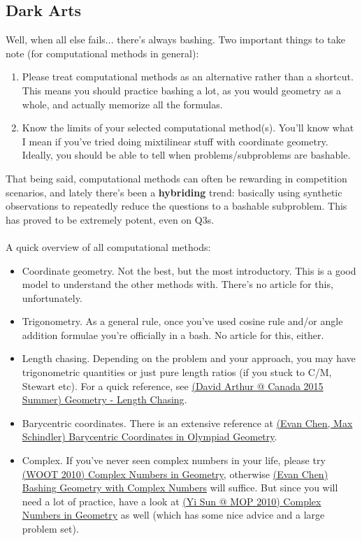 	\subsection{Dark Arts}
	Well, when all else fails... there's always bashing.
	Two important things to take note (for computational methods in general):
	\begin{enumerate}
	\item Please treat computational methods as an alternative rather than a shortcut. This means you should practice bashing a lot, as you would geometry as a whole, and actually memorize all the formulas.
	\item Know the limits of your selected computational method(s). You'll know what I mean if you've tried doing mixtilinear stuff with coordinate geometry. Ideally, you should be able to tell when problems/subproblems are bashable.
	\end{enumerate}
	That being said, computational methods can often be rewarding in competition scenarios, and lately there's been a \textbf{hybriding} trend: basically using synthetic observations to repeatedly reduce the questions to a bashable subproblem. This has proved to be extremely potent, even on Q3s.\\\\
	A quick overview of all computational methods:
	\begin{itemize}
	\item Coordinate geometry. Not the best, but the most introductory. This is a good model to understand the other methods with. There's no article for this, unfortunately.
	\item Trigonometry. As a general rule, once you've used cosine rule and/or angle addition formulae you're officially in a bash. No article for this, either.
	\item Length chasing. Depending on the problem and your approach, you may have trigonometric quantities or just pure length ratios (if you stuck to C/M, Stewart etc). For a quick reference, see \href{run:./F_Geometry/(David Arthur @ Canada 2015 Summer) Geometry - Length Chasing.pdf}{(David Arthur @ Canada 2015 Summer) Geometry - Length Chasing}.
	\item Barycentric coordinates. There is an extensive reference at \href{run:./F_Geometry/(Evan Chen, Max Schindler) Barycentric Coordinates in Olympiad Geometry.pdf}{(Evan Chen, Max Schindler) Barycentric Coordinates in Olympiad Geometry}.
	\item Complex. If you've never seen complex numbers in your life, please try \href{run:./F_Geometry/(WOOT 2010) Complex Numbers in Geometry.pdf}{(WOOT 2010) Complex Numbers in Geometry}, otherwise \href{(Evan Chen) Bashing Geometry with Complex Numbers.pdf}{(Evan Chen) Bashing Geometry with Complex Numbers} will suffice. But since you will need a lot of practice, have a look at \href{run:./F_Geometry/(Yi Sun @ MOP 2010) Complex Numbers in Geometry.pdf}{(Yi Sun @ MOP 2010) Complex Numbers in Geometry} as well (which has some nice advice and a large problem set).
	\end{itemize}
